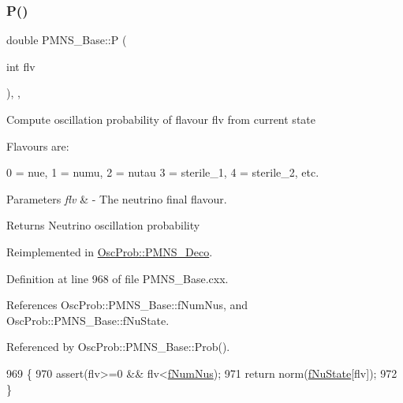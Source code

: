 \subsubsection{\texorpdfstring{P()}{P()}}
{\footnotesize\ttfamily double P\+M\+N\+S\+\_\+\+Base\+::P (\begin{DoxyParamCaption}\item[{int}]{flv }\end{DoxyParamCaption})\hspace{0.3cm}{\ttfamily [protected]}, {\ttfamily [virtual]}, {\ttfamily [inherited]}}

Compute oscillation probability of flavour flv from current state

Flavours are\+: 
\begin{DoxyPre}
  0 = nue, 1 = numu, 2 = nutau
  3 = sterile\_1, 4 = sterile\_2, etc.
\end{DoxyPre}
 
\begin{DoxyParams}{Parameters}
{\em flv} & -\/ The neutrino final flavour.\\
\hline
\end{DoxyParams}
\begin{DoxyReturn}{Returns}
Neutrino oscillation probability 
\end{DoxyReturn}


Reimplemented in \hyperlink{classOscProb_1_1PMNS__Deco_aa81f47ea36207b90a5feb9849060032d}{Osc\+Prob\+::\+P\+M\+N\+S\+\_\+\+Deco}.



Definition at line 968 of file P\+M\+N\+S\+\_\+\+Base.\+cxx.



References Osc\+Prob\+::\+P\+M\+N\+S\+\_\+\+Base\+::f\+Num\+Nus, and Osc\+Prob\+::\+P\+M\+N\+S\+\_\+\+Base\+::f\+Nu\+State.



Referenced by Osc\+Prob\+::\+P\+M\+N\+S\+\_\+\+Base\+::\+Prob().


\begin{DoxyCode}
969 \{
970   assert(flv>=0 && flv<\hyperlink{classOscProb_1_1PMNS__Base_a24bb74bed63569dfe88b18fa6a08060e}{fNumNus});
971   \textcolor{keywordflow}{return} norm(\hyperlink{classOscProb_1_1PMNS__Base_ad38a7107c3ab393591fd5ba21658300b}{fNuState}[flv]);
972 \}
\end{DoxyCode}
\mbox{\label{classOscProb_1_1PMNS__Base_aec5c399b93261f1962a4b7dbbb44b973}} 
